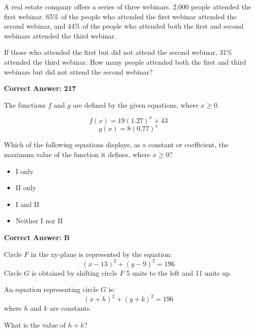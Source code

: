 \documentclass{article}
\begin{document}
\begin{tcolorbox}[colback=blue!5!white,colframe=blue!75!black,title=Question 3]
A real estate company offers a series of three webinars. 2,000 people attended the first webinar. 65\% of the people who attended the first webinar attended the second webinar, and 44\% of the people who attended both the first and second webinars attended the third webinar. 

If those who attended the first but did not attend the second webinar, 31\% attended the third webinar. How many people attended both the first and third webinars but did not attend the second webinar?

\end{tcolorbox}

\begin{tcolorbox}[colback=green!10, colframe=green!50!black,title=Answer to Question 3]
\textbf{Correct Answer: 217}  
\end{tcolorbox}

\vspace{20pt}

\begin{tcolorbox}[colback=blue!5!white,colframe=blue!75!black,title=Question 4]
The functions \( f \) and \( g \) are defined by the given equations, where \( x \geq 0 \). 

\[
f(x) = 19(1.27)^x + 43
\]
\[
g(x) = 8(0.77)^x
\]

Which of the following equations displays, as a constant or coefficient, the maximum value of the function it defines, where \( x \geq 0 \)?

\begin{itemize}
    \item[A.] I only
    \item[B.] II only
    \item[C.] I and II
    \item[D.] Neither I nor II
\end{itemize}
\end{tcolorbox}

\begin{tcolorbox}[colback=green!10, colframe=green!50!black,title=Answer to Question 4]
\textbf{Correct Answer: B}  
\end{tcolorbox}




\begin{tcolorbox}[colback=blue!5!white,colframe=blue!75!black,title=Question 5]
Circle \( F \) in the xy-plane is represented by the equation:
\[
(x - 13)^2 + (y - 9)^2 = 196
\]
Circle \( G \) is obtained by shifting circle \( F \) 5 units to the left and 11 units up.

An equation representing circle \( G \) is:
\[
(x + h)^2 + (y + k)^2 = 196
\]
where \( h \) and \( k \) are constants.

What is the value of \( h + k \)?
\end{tcolorbox}
\end{document}
